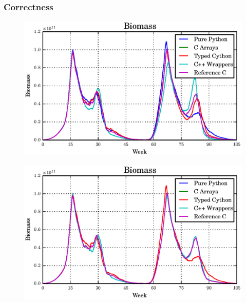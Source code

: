 \documentclass[t]{beamer}
\begin{document}
\begin{frame}[c]
	\frametitle{Correctness}
	\begin{figure}[H]
	  \begin{center}
	    \includegraphics[width=0.9\columnwidth]{graphs/bio-fixed-single-float-comp.eps}
	  \end{center}
	\end{figure}
\end{frame}


\begin{frame}[c]
	\begin{figure}[H]
	  \begin{center}
	    \includegraphics[width=\columnwidth]{graphs/bio-fixed-single-double-comp.eps}
	  \end{center}
	\end{figure}
\end{frame}
\end{document}
